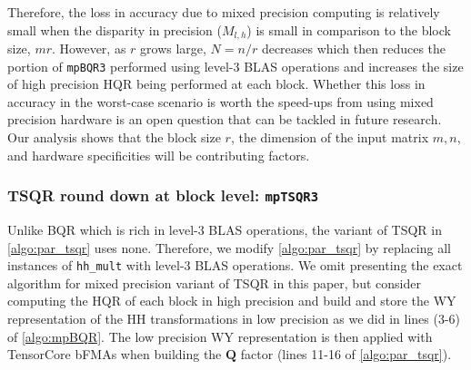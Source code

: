 \documentclass[review,onefignum,onetabnum]{siamart190516}
\newcommand{\bb}[1]{\mathbf{#1}}
\begin{document}
Therefore, the loss in accuracy due to mixed precision computing is relatively small when the disparity in precision ($M_{l,h}$) is small in comparison to the block size, $mr$.
However, as $r$ grows large, $N=n/r$ decreases which then reduces the portion of {\tt mpBQR3} performed using level-3 BLAS operations and increases the size of high precision HQR being performed at each block.
Whether this loss in accuracy in the worst-case scenario is worth the speed-ups from using mixed precision hardware is an open question that can be tackled in future research.
Our analysis shows that the block size $r$, the dimension of the input matrix $m,n$, and hardware specificities will be contributing factors. 

\subsubsection{TSQR round down at block level: {\tt mpTSQR3}}\label{sec:mp-3t}
Unlike BQR which is rich in level-3 BLAS operations, the variant of TSQR in \cref{algo:par_tsqr} uses none.
Therefore, we modify \cref{algo:par_tsqr} by replacing all instances of {\tt hh\_mult} with level-3 BLAS operations.
We omit presenting the exact algorithm for mixed precision variant of TSQR in this paper, but consider computing the HQR of each block in high precision and build and store the WY representation of the HH transformations in low precision as we did in lines (3-6) of \cref{algo:mpBQR}.
The low precision WY representation is then applied with TensorCore bFMAs when building the $\bb{Q}$ factor (lines 11-16 of \cref{algo:par_tsqr}).
\end{document}
